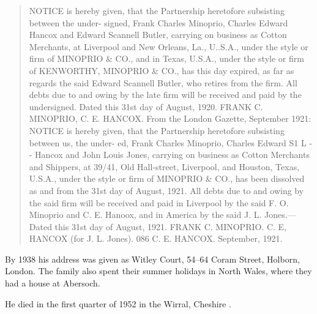 \begin{quotation}
NOTICE is hereby given, that the Partnership heretofore subsisting between the under- signed, Frank Charles Minoprio, Charles Edward Hancox and Edward Scannell Butler, carrying on business as Cotton Merchants, at Liverpool and New Orleans, La., U..S.A., under the style or firm of MINOPRIO \& CO., and in Texas, U.S.A., under the style or firm of KENWORTHY, MINOPRIO \& CO., has this day expired, as far as regards the said Edward Scannell Butler, who retires from the firm. All debts due to and owing by the late firm will be received and paid by the undersigned. Dated this 31st day of August, 1920. FRANK C. MINOPRIO, C. E. HANCOX. From the London Gazette, September 1921: NOTICE is hereby given, that the Partnership heretofore subsisting between us, the under- ed, Frank Charles Minoprio, Charles Edward S1 L - - Hancox and John Louis Jones, carrying on business as Cotton Merchants and Shippers, at 39/41, Old Hall-street, Liverpool, and Houston, Texas, U.S.A., under the style or firm of MINOPRIO \& CO., has been dissolved as and from the 31st day of August, 1921. All debts due to and owing by the said firm will be received and paid in Liverpool by the said F. O. Minoprio and C. E. Hanoox, and in America by the said J. L. Jones.—Dated this 31st day of August, 1921. FRANK C. MINOPRIO. C. E, HANCOX (for J. L. Jones). 086 C. E. HANCOX. September, 1921.
\end{quotation}

 By 1938 his address was given as Witley Court, 54--64 Coram Street, Holborn, London.\cite{CharlesEdwardHancoxLondonhouse}  The family also spent their summer holidays in North Wales, where they had a house at Abersoch.

He died in the first quarter of 1952 in the Wirral, Cheshire \cite{CEHancoxDeath}.
